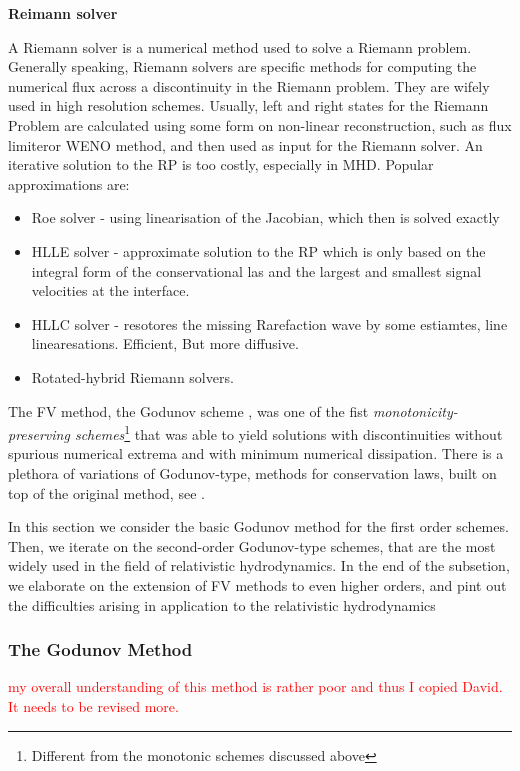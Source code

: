 \textbf{Reimann solver} 

A Riemann solver is a numerical method used to solve a Riemann problem. Generally speaking, Riemann solvers are specific methods for computing the numerical flux across a discontinuity in the Riemann problem. They are wifely used in high resolution schemes. Usually, left and right states for the Riemann Problem are calculated using some form on non-linear reconstruction, such as flux limiteror \ac{WENO} method, and then used as input for the Riemann solver. 
An iterative solution to the RP is too costly, especially in \ac{MHD}. Popular approximations are:

\begin{itemize}
    \item Roe solver - using linearisation of the Jacobian, which then is solved exactly 
    \item \ac{HLLE} solver - approximate solution to the RP which is only based on the integral form of the conservational las and the largest and smallest signal velocities at the interface.
    \item \ac{HLLC} solver - resotores the missing Rarefaction wave by some estiamtes, line linearesations. Efficient, But more diffusive. 
    \item Rotated-hybrid Riemann solvers. 
\end{itemize}



The \ac{FV} method, the Godunov scheme \citep{Godunov:1959}, was one of the fist \textit{monotonicity-preserving schemes}\footnote{Different from the monotonic schemes discussed above} that was able to yield solutions with discontinuities without spurious numerical extrema and with minimum numerical dissipation. There is a plethora of variations of Godunov-type, methods for conservation laws, built on top of the original method, see \cite[\eg][]{Toro:1999}.

In this section we consider the basic Godunov method for the first order schemes. Then, we iterate on the second-order Godunov-type schemes, that are the most widely used in the field of relativistic hydrodynamics. In the end of the subsetion, we elaborate on the extension of FV methods to even higher orders, and pint out the difficulties arising in application to the relativistic hydrodynamics 



\subsubsection{The Godunov Method}
\textcolor{red}{my overall understanding of this method is rather poor and thus I copied David. It needs to be revised more.}

